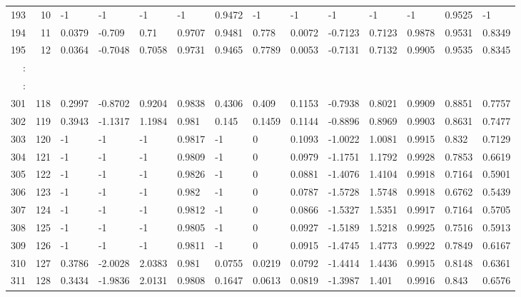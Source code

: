 \begin{table}[p]
{\begin{minipage}{\textheight}
\begin{tabular}{rr||lll|lll||lll|lll}
193    & 10   & -1      & -1      & -1     & -1     & 0.9472 & -1     & -1      & -1      & -1     & -1     & 0.9525 & -1     \\
194    & 11   & 0.0379  & -0.709  & 0.71   & 0.9707 & 0.9481 & 0.778  & 0.0072  & -0.7123 & 0.7123 & 0.9878 & 0.9531 & 0.8349 \\
195    & 12   & 0.0364  & -0.7048 & 0.7058 & 0.9731 & 0.9465 & 0.7789 & 0.0053  & -0.7131 & 0.7132 & 0.9905 & 0.9535 & 0.8345 \\
:      &      &         &         &        &        &        &        &         &         &        &        &        &        \\
\hline
:      &      &         &         &        &        &        &        &         &         &        &        &        &        \\
301    & 118  & 0.2997  & -0.8702 & 0.9204 & 0.9838 & 0.4306 & 0.409  & 0.1153  & -0.7938 & 0.8021 & 0.9909 & 0.8851 & 0.7757 \\
302    & 119  & 0.3943  & -1.1317 & 1.1984 & 0.981  & 0.145  & 0.1459 & 0.1144  & -0.8896 & 0.8969 & 0.9903 & 0.8631 & 0.7477 \\
303    & 120  & -1      & -1      & -1     & 0.9817 & -1     & 0      & 0.1093  & -1.0022 & 1.0081 & 0.9915 & 0.832  & 0.7129 \\
304    & 121  & -1      & -1      & -1     & 0.9809 & -1     & 0      & 0.0979  & -1.1751 & 1.1792 & 0.9928 & 0.7853 & 0.6619 \\
305    & 122  & -1      & -1      & -1     & 0.9826 & -1     & 0      & 0.0881  & -1.4076 & 1.4104 & 0.9918 & 0.7164 & 0.5901 \\
306    & 123  & -1      & -1      & -1     & 0.982  & -1     & 0      & 0.0787  & -1.5728 & 1.5748 & 0.9918 & 0.6762 & 0.5439 \\
307    & 124  & -1      & -1      & -1     & 0.9812 & -1     & 0      & 0.0866  & -1.5327 & 1.5351 & 0.9917 & 0.7164 & 0.5705 \\
308    & 125  & -1      & -1      & -1     & 0.9805 & -1     & 0      & 0.0927  & -1.5189 & 1.5218 & 0.9925 & 0.7516 & 0.5913 \\
309    & 126  & -1      & -1      & -1     & 0.9811 & -1     & 0      & 0.0915  & -1.4745 & 1.4773 & 0.9922 & 0.7849 & 0.6167 \\
310    & 127  & 0.3786  & -2.0028 & 2.0383 & 0.981  & 0.0755 & 0.0219 & 0.0792  & -1.4414 & 1.4436 & 0.9915 & 0.8148 & 0.6361 \\
311    & 128  & 0.3434  & -1.9836 & 2.0131 & 0.9808 & 0.1647 & 0.0613 & 0.0819  & -1.3987 & 1.401  & 0.9916 & 0.843  & 0.6576 \\

\end{tabular}
\end{minipage}}
\end{table}

